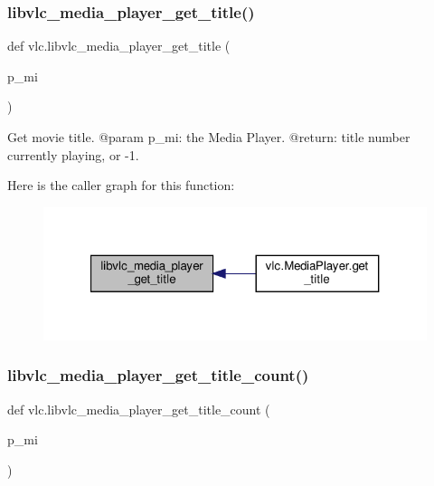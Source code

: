 \subsubsection{\texorpdfstring{libvlc\+\_\+media\+\_\+player\+\_\+get\+\_\+title()}{libvlc\_media\_player\_get\_title()}}
{\footnotesize\ttfamily def vlc.\+libvlc\+\_\+media\+\_\+player\+\_\+get\+\_\+title (\begin{DoxyParamCaption}\item[{}]{p\+\_\+mi }\end{DoxyParamCaption})}

\begin{DoxyVerb}Get movie title.
@param p_mi: the Media Player.
@return: title number currently playing, or -1.
\end{DoxyVerb}
 Here is the caller graph for this function\+:
\nopagebreak
\begin{figure}[H]
\begin{center}
\leavevmode
\includegraphics[width=321pt]{namespacevlc_af14b0c9e3e60e215a97f32ee65a5bb2d_icgraph}
\end{center}
\end{figure}
\mbox{\label{namespacevlc_a928f5b0cc17b98170b0a0bf9b045a504}} 
\subsubsection{\texorpdfstring{libvlc\+\_\+media\+\_\+player\+\_\+get\+\_\+title\+\_\+count()}{libvlc\_media\_player\_get\_title\_count()}}
{\footnotesize\ttfamily def vlc.\+libvlc\+\_\+media\+\_\+player\+\_\+get\+\_\+title\+\_\+count (\begin{DoxyParamCaption}\item[{}]{p\+\_\+mi }\end{DoxyParamCaption})}


